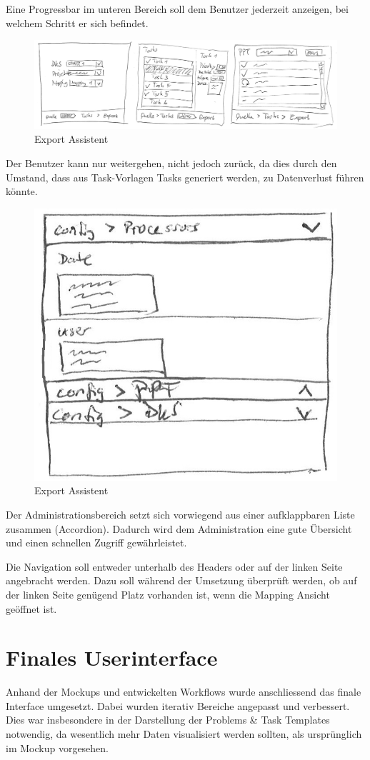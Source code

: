 		Eine Progressbar im unteren Bereich soll dem Benutzer jederzeit anzeigen, bei welchem Schritt er sich befindet.
		
		\begin{figure}[H]
			\includegraphics[width=\linewidth]{interfacesAndProtocols/media/img/exportWorkflow.jpg}
			\caption{Export Assistent}
			\label{fig:exportAssistent}
		\end{figure}	
		
		Der Benutzer kann nur weitergehen, nicht jedoch zurück, da dies durch den Umstand, 
		dass aus Task-Vorlagen Tasks generiert werden, 
		zu Datenverlust führen könnte.
		
		\begin{figure}[H]
			\centering
			\includegraphics[width=0.3\linewidth]{interfacesAndProtocols/media/img/administration.jpg}
			\caption{Export Assistent}
			\label{fig:administration}
		\end{figure}	
		
		Der Administrationsbereich setzt sich vorwiegend aus einer aufklappbaren Liste zusammen (Accordion). Dadurch wird dem Administration eine gute Übersicht und einen schnellen Zugriff gewährleistet.
		
		Die Navigation soll entweder unterhalb des Headers oder auf der linken Seite angebracht werden. Dazu soll während der Umsetzung überprüft werden, ob auf der linken Seite genügend Platz vorhanden ist, wenn die Mapping Ansicht geöffnet ist.
		
		
	\section{Finales Userinterface}
	
		Anhand der Mockups und entwickelten Workflows wurde anschliessend das finale Interface umgesetzt.
		Dabei wurden iterativ Bereiche angepasst und verbessert.
		Dies war insbesondere in der Darstellung der Problems \& Task Templates notwendig, 
		da wesentlich mehr Daten visualisiert werden sollten, als ursprünglich im Mockup vorgesehen.
		
